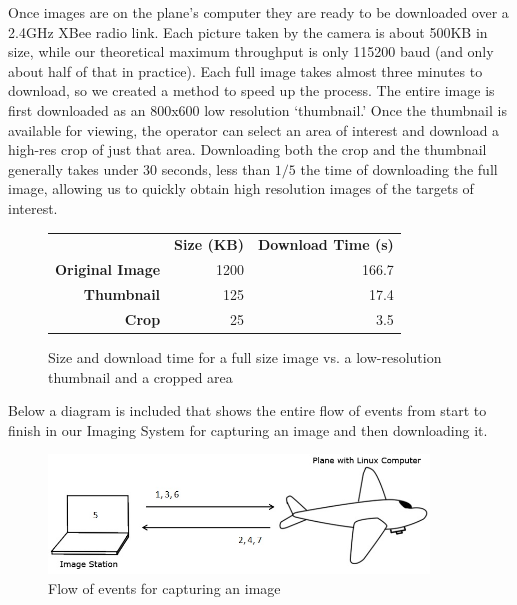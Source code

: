 \documentclass[pdftex,10pt,letter]{article}
\begin{document}
Once images are on the plane's computer they are ready to be downloaded over a 2.4GHz XBee radio link.  Each picture taken by the camera is about 500KB in size, while our theoretical maximum throughput is only 115200 baud (and only about half of that in practice).  Each full image takes almost three minutes to download, so we created a method to speed up the process.  The entire image is first downloaded as an 800x600 low resolution `thumbnail.'  Once the thumbnail is available for viewing, the operator can select an area of interest and download a high-res crop of just that area.  Downloading both the crop and the thumbnail generally takes under 30 seconds, less than $1/5$ the time of downloading the full image, allowing us to quickly obtain high resolution images of the targets of interest.

\begin{figure} [H]
	\centering
		\begin{tabular}{rrr}
		 & {\bf Size (KB)} & {\bf Download Time (s)} \\
		 {\bf Original Image} &        1200 &       166.7 \\
		 {\bf Thumbnail} &        125 &       17.4 \\
		 {\bf Crop} &         25 &        3.5 \\
		\end{tabular}
	\caption[Download Times for Images] {Size and download time for a full size image vs. a low-resolution thumbnail and a cropped area}
	\label{fig:imagedownloadtimes}
\end{figure}

Below a diagram is included that shows the entire flow of events from start to finish in our Imaging System for capturing an image and then downloading it.

\begin{figure} [H]
  \centering
  	\includegraphics[width=0.9\textwidth]{../images/CaptureProcess.jpg}
  	\caption[Image Capture Process]{Flow of events for capturing an image}
  	\label{fig:imagecaptureprocess}
\end{figure}
\end{document}
